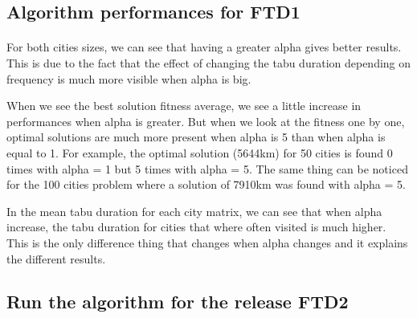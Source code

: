 \documentclass[12pt,oneside,a4paper]{article}
\begin{document}
\subsection{Algorithm performances for FTD1}
\paragraph{}
For both cities sizes, we can see that having a greater alpha gives better results.
This is due to the fact that the effect of changing the tabu duration depending
on frequency is much more visible when alpha is big.

When we see the best solution fitness average, we see a little increase in
performances when alpha is greater. But when we look at the fitness one by one,
optimal solutions are much more present when alpha is 5 than when alpha is equal to 1.
For example, the optimal solution (5644km) for 50 cities is found 0 times with alpha = 1 but
5 times with alpha = 5. The same thing can be noticed for the 100 cities problem where
a solution of 7910km was found with alpha = 5.

In the mean tabu duration for each city matrix, we can see that when alpha increase, the tabu
duration for cities that where often visited is much higher. This is the only difference thing
that changes when alpha changes and it explains the different results.

\subsection{Run the algorithm for the release FTD2}
\end{document}
